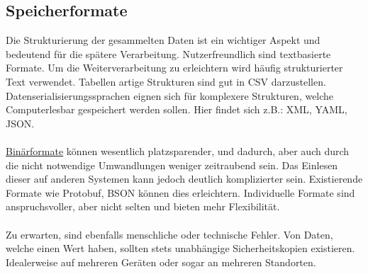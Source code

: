 \documentclass[ngerman]{schoolPres}
\begin{document}
  \subsection{Speicherformate}%
  \begin{frame}
    Die Strukturierung der gesammelten Daten ist ein wichtiger Aspekt und bedeutend für die spätere Verarbeitung.
    Nutzerfreundlich sind textbasierte Formate.
    Um die Weiterverarbeitung zu erleichtern wird häufig strukturierter Text verwendet.
    Tabellen artige Strukturen sind gut in CSV darzustellen.
    Datenserialisierungssprachen eignen sich für komplexere Strukturen, welche Computerlesbar gespeichert werden
    sollen. Hier findet sich z.B.: XML, YAML, JSON.\\~\\

    \href{https://de.wikipedia.org/wiki/Bin\%C3\%A4rdatei}{Binärformate} können wesentlich platzsparender,
    und dadurch, aber auch durch die nicht notwendige Umwandlungen weniger zeitraubend sein.
    Das Einlesen dieser auf anderen Systemen kann jedoch deutlich komplizierter sein.
    Existierende Formate wie Protobuf, BSON können dies erleichtern.
    Individuelle Formate sind anspruchsvoller, aber nicht selten und bieten mehr Flexibilität.\\~\\

    Zu erwarten, sind ebenfalls menschliche oder technische Fehler.
    Von Daten, welche einen Wert haben, sollten stets unabhängige Sicherheitskopien existieren.
    Idealerweise auf mehreren Geräten oder sogar an mehreren Standorten\cite{chervenak-backup}.

  \end{frame}
\end{document}
